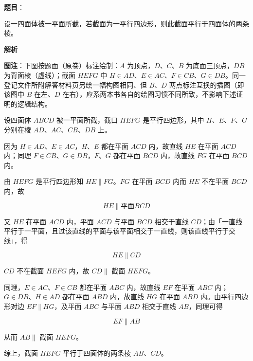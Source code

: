 \begin{answer}

\textbf{题目}：

设一四面体被一平面所截，若截面为一平行四边形，则此截面平行于四面体的两条棱。
\nopagebreak[4]
\begin{center}\end{center}
\nopagebreak[4]
\textbf{解析}

\begin{gktip}
\textbf{图注}：下图按题面（原卷）标注绘制：$A$ 为顶点，$D$、$C$、$B$ 为底面三顶点，$DB$ 为背面棱（虚线）；截面 $HEFG$ 中 $H\in AD$、$E\in AC$、$F\in CB$、$G\in DB$。同一登记文件所附解答材料页另绘一幅构图相同、但 $B$、$D$ 两点标注互换的插图（即该图中 $B$ 在左、$D$ 在右），应系两本书各自的绘图习惯不同所致，不影响下述证明的逻辑结构。
\end{gktip}
\nopagebreak[4]
\begin{center}\end{center}
\nopagebreak[4]
设四面体 $ABCD$ 被一平面所截，截口 $HEFG$ 是平行四边形，其中 $H$、$E$、$F$、$G$ 分别在棱 $AD$、$AC$、$CB$、$DB$ 上。

因为 $H\in AD$、$E\in AC$，$H$、$E$ 都在平面 $ACD$ 内，故直线 $HE$ 在平面 $ACD$ 内；同理 $F\in CB$、$G\in DB$，$F$、$G$ 都在平面 $BCD$ 内，故直线 $FG$ 在平面 $BCD$ 内。

由 $HEFG$ 是平行四边形知 $HE\parallel FG$。$FG$ 在平面 $BCD$ 内而 $HE$ 不在平面 $BCD$ 内，故

\nopagebreak[4]
\[
HE\parallel\text{平面}BCD
\]

又 $HE$ 在平面 $ACD$ 内，平面 $ACD$ 与平面 $BCD$ 相交于直线 $CD$；由「一直线平行于一平面，且过该直线的平面与该平面相交于一直线，则该直线平行于交线」，得

\nopagebreak[4]
\[
HE\parallel CD
\]

$CD$ 不在截面 $HEFG$ 内，故 $CD\parallel$ 截面 $HEFG$。

同理，$E\in AC$、$F\in CB$ 都在平面 $ABC$ 内，故直线 $EF$ 在平面 $ABC$ 内；$G\in DB$、$H\in AD$ 都在平面 $ABD$ 内，故直线 $HG$ 在平面 $ABD$ 内。由平行四边形对边 $EF\parallel HG$，及平面 $ABC$ 与平面 $ABD$ 相交于直线 $AB$，同理可得

\nopagebreak[4]
\[
EF\parallel AB
\]

从而 $AB\parallel$ 截面 $HEFG$。

综上，截面 $HEFG$ 平行于四面体的两条棱 $AB$、$CD$。


\end{answer}
